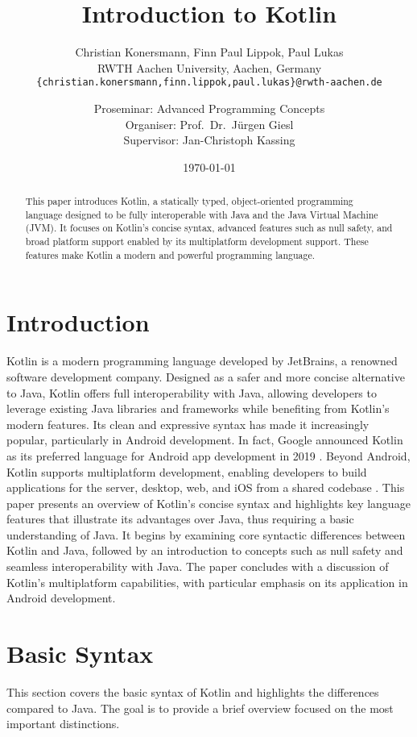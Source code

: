 \documentclass[a4paper, 11pt]{article}
\title{\huge \bfseries Introduction to Kotlin}
\author{
  Christian Konersmann, Finn Paul Lippok, Paul Lukas \\[1ex]
  RWTH Aachen University, Aachen, Germany \\
  \texttt{\{christian.konersmann,finn.lippok,paul.lukas\}@rwth-aachen.de} \\
  \and
  Proseminar: Advanced Programming Concepts \\
  Organiser: Prof.\ Dr.\ Jürgen Giesl \\
  Supervisor: Jan-Christoph Kassing
}
\date{\today}
\begin{document}
\maketitle

\begin{abstract}
This paper introduces Kotlin, a statically typed, object-oriented programming language designed to be fully interoperable with Java and the Java Virtual Machine (JVM). It focuses on Kotlin's concise syntax, advanced features such as null safety, and broad platform support enabled by its multiplatform development support. These features make Kotlin a modern and powerful programming language.
\end{abstract}

\section{Introduction}
Kotlin is a modern programming language developed by JetBrains, a renowned software development company. Designed as a safer and more concise alternative to Java, Kotlin offers full interoperability with Java, allowing developers to leverage existing Java libraries and frameworks while benefiting from Kotlin's modern features. Its clean and expressive syntax has made it increasingly popular, particularly in Android development. In fact, Google announced Kotlin as its preferred language for Android app development in 2019 \cite{intro-google}. Beyond Android, Kotlin supports multiplatform development, enabling developers to build applications for the server, desktop, web, and iOS from a shared codebase \cite{intro-multiplatform-dev}.
This paper presents an overview of Kotlin’s concise syntax and highlights key language features that illustrate its advantages over Java, thus requiring a basic understanding of Java. It begins by examining core syntactic differences between Kotlin and Java, followed by an introduction to concepts such as null safety and seamless interoperability with Java. The paper concludes with a discussion of Kotlin’s multiplatform capabilities, with particular emphasis on its application in Android development.

\section{Basic Syntax}
This section covers the basic syntax of Kotlin and highlights the differences compared to Java.
The goal is to provide a brief overview focused on the most important distinctions.
\end{document}
